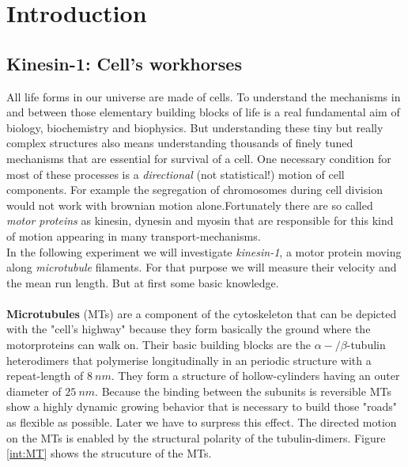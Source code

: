 \section{Introduction}
	\subsection{Kinesin-1: Cell's workhorses}
		All life forms in our universe are made of cells. To understand the mechanisms in and between those elementary building blocks of life is a real fundamental aim of biology, biochemistry and biophysics. But understanding these tiny but really complex structures also means understanding thousands of finely tuned mechanisms that are essential for survival of a cell. One necessary condition for most of these processes is a \textit{directional} (not statistical!) motion of cell components. For example the segregation of chromosomes during cell division would not work with brownian motion alone.Fortunately there are so called \textit{motor proteins} as kinesin, dynesin and myosin that are responsible for this kind of motion appearing in many transport-mechanisms.\\
		In the following experiment we will investigate \textit{kinesin-1}, a motor protein moving along \textit{microtubule} filaments. For that purpose we will measure their velocity and the mean run length. But at first some basic knowledge.\\
		\ \\
		\textbf{Microtubules} (MTs) are a component of the cytoskeleton that can be depicted with the "cell's highway" because they form basically the ground where the motorproteins can walk on. Their basic building blocks are the $\alpha-/\beta$-tubulin heterodimers that polymerise longitudinally in an periodic structure with a repeat-length of $8\ \unit{nm}$. They form a structure of hollow-cylinders having an outer diameter of $25\ \unit{nm}$. Because the binding between the subunits is reversible MTs show a highly dynamic growing behavior that is necessary to build those "roads" as flexible as possible. Later we have to surpress this effect. The directed motion on the MTs is enabled by the structural polarity of the tubulin-dimers. Figure \ref{int:MT} shows the strucuture of the MTs.\cite{PA}\\
